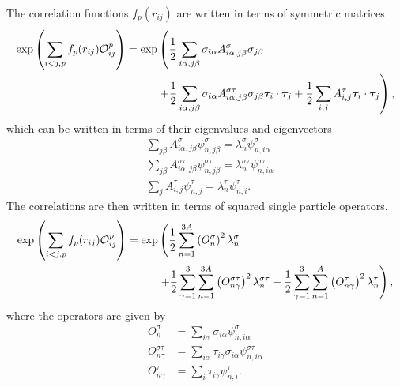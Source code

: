 The correlation functions $f_p(r_{ij})$ are written in terms of symmetric matrices
\begin{equation}
\begin{split}
   \exp\left(\sum\limits_{i<j,p}f_p(r_{ij})\mathcal{O}^p_{ij}\right) = \exp&\left(\frac{1}{2}\sum\limits_{i\alpha,j\beta} \sigma_{i\alpha}A^{\sigma}_{i\alpha,j\beta}\sigma_{j\beta}\right. \\
      &\left. + \frac{1}{2}\sum\limits_{i\alpha,j\beta} \sigma_{i\alpha}A^{\sigma\tau}_{i\alpha,j\beta}\sigma_{j\beta}\bm{\tau}_i\cdot\bm{\tau}_j
      + \frac{1}{2}\sum\limits_{i,j} A^{\tau}_{i,j}\bm{\tau}_i\cdot\bm{\tau}_j\right),
   \label{equ:amatricies}
\end{split}
\end{equation}
which can be written in terms of their eigenvalues and eigenvectors
\begin{align}
   &\sum\limits_{j\beta} A^{\sigma}_{i\alpha,j\beta}\psi^{\sigma}_{n,j\beta} = \lambda^{\sigma}_n\psi^{\sigma}_{n,i\alpha} \\
   &\sum\limits_{j\beta} A^{\sigma\tau}_{i\alpha,j\beta}\psi^{\sigma\tau}_{n,j\beta} = \lambda^{\sigma\tau}_n\psi^{\sigma\tau}_{n,i\alpha} \\
   &\sum\limits_{j} A^{\tau}_{i,j}\psi^{\tau}_{n,j} = \lambda^{\tau}_n\psi^{\tau}_{n,i}.
\end{align}
The correlations are then written in terms of squared single particle operators,
\begin{equation}
\begin{split}
   \exp\left(\sum\limits_{i<j,p}f_p(r_{ij})\mathcal{O}^p_{ij}\right) = \exp&\left(\frac{1}{2}\sum\limits_{n=1}^{3A} \left(O_{n}^{\sigma}\right)^2 \lambda_n^{\sigma}\right. \\
      & \left. + \frac{1}{2}\sum\limits_{\gamma=1}^{3}\sum\limits_{n=1}^{3A} \left(O_{n\gamma}^{\sigma\tau}\right)^2 \lambda_n^{\sigma\tau}
      + \frac{1}{2}\sum\limits_{\gamma=1}^{3}\sum\limits_{n=1}^{A} \left(O_{n\gamma}^{\tau}\right)^2 \lambda_n^{\tau}\right),
\end{split}
\end{equation}
where the operators are given by
\begin{equation}
\begin{split}
   O_{n}^{\sigma} &= \sum\limits_{i\alpha} \sigma_{i\alpha}\psi_{n,i\alpha}^{\sigma} \\
   O_{n\gamma}^{\sigma\tau} &= \sum\limits_{i\alpha} \tau_{i\gamma}\sigma_{i\alpha}\psi_{n,i\alpha}^{\sigma\tau} \\
   O_{n\gamma}^{\tau} &= \sum\limits_{i} \tau_{i\gamma}\psi_{n,i}^{\tau}.
   \label{equ:OA}
\end{split}
\end{equation}
